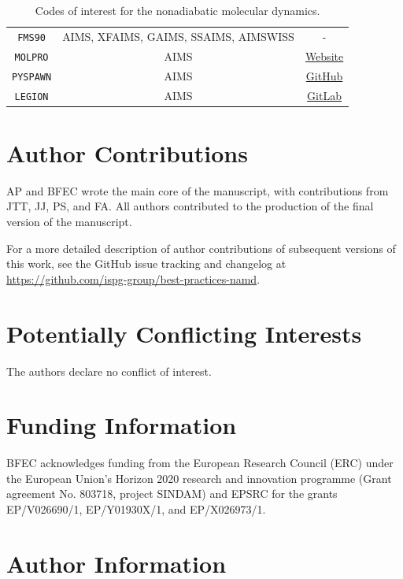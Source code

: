 \documentclass[9pt,bestpractices]{livecoms}
\newcommand{\githubrepository}{\url{https://github.com/ispg-group/best-practices-namd}}  %
\begin{document}
\begin{table}[h!]
\begin{tabular}{|c|c|c|}
        \texttt{FMS90} & AIMS, XFAIMS, GAIMS, SSAIMS, AIMSWISS  & - \\ 
        \texttt{MOLPRO} & AIMS & \href{https://www.molpro.net}{Website} \\
        \texttt{PYSPAWN} & AIMS  & \href{https://github.com/blevine37/pySpawn17}{GitHub} \\ 
        \texttt{LEGION} & AIMS  & \href{https://gitlab.com/light-and-molecules/legion}{GitLab} \\  
    \hline
    \end{tabular}
    \caption{Codes of interest for the nonadiabatic molecular dynamics.}
    \label{tab:NAMD}
\end{table}

\clearpage

\section*{Author Contributions}


AP and BFEC wrote the main core of the manuscript, with contributions from JTT, JJ, PS, and FA. All authors contributed to the production of the final version of the manuscript.

For a more detailed description of author contributions of subsequent versions of this work, see the GitHub issue tracking and changelog at \githubrepository.


\section*{Potentially Conflicting Interests}

The authors declare no conflict of interest. 

\section*{Funding Information}

BFEC acknowledges funding from the European Research Council (ERC) under the European Union's Horizon 2020 research and innovation programme (Grant agreement No. 803718, project SINDAM) and EPSRC for the grants EP/V026690/1, EP/Y01930X/1, and EP/X026973/1.

\section*{Author Information}
\makeorcid

\end{document}
